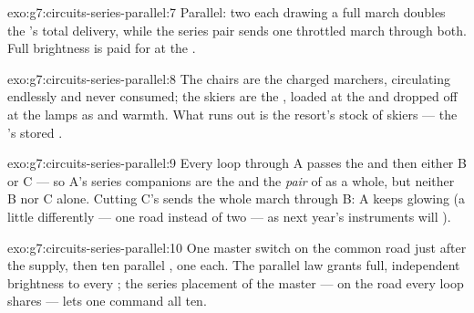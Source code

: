 \begin{solution}{exo:g7:circuits-series-parallel:7}
Parallel: two  each drawing a full march doubles the
's total delivery, while the series pair sends one
throttled march through both. Full brightness is paid for at the
.
\end{solution}

\begin{solution}{exo:g7:circuits-series-parallel:8}
The chairs are the charged marchers, circulating endlessly and
never consumed; the skiers are the , loaded at the 
and dropped off at the lamps as  and warmth. What runs out
is the resort's stock of skiers --- the 's stored .
\end{solution}

\begin{solution}{exo:g7:circuits-series-parallel:9}
Every loop through A passes the  and then either B or C ---
so A's series companions are the  and the \emph{pair} of
 as a whole, but neither B nor C alone. Cutting C's
 sends the whole march through B: A keeps glowing (a little
differently --- one road instead of two --- as next year's
instruments will ).
\end{solution}

\begin{solution}{exo:g7:circuits-series-parallel:10}
One master switch on the common road just after the supply, then
ten parallel , one  each. The parallel law grants
full, independent brightness to every ; the series placement
of the master --- on the road every loop shares --- lets one
 command all ten.
\end{solution}

